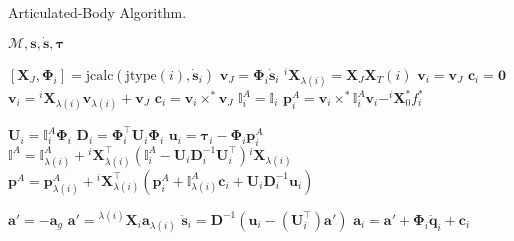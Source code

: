 \begin{algorithm}[h]
    \caption{Articulated-Body Algorithm.}
    \label{alg:aba}
    \begin{algorithmic}[1]
        \Require $\mathcal{M}, \mathbf{s}, \dot{\mathbf{s}}, \boldsymbol{\tau}$

        \State $[\mathbf{X}_J, \boldsymbol{\Phi}_i] = \text{jcalc}(\text{jtype}(i), \dot{\mathbf{s}}_i)$
        \State $\mathrm{\mathbf{v}}_J = \boldsymbol{\Phi}_i \dot{\mathbf{s}}_i$
        \State $^i\mathbf{X}_{\lambda(i)} = \mathbf{X}_J\mathbf{X}_T (i)$
        \State $\mathrm{\mathbf{v}}_i = \mathrm{\mathbf{v}}_J$
        \State $\mathbf{c}_i = \mathbf{0}$
        \Else
        \State $\mathrm{\mathbf{v}}_i = {}^i\mathbf{X} _{\lambda(i)}\mathrm{\mathbf{v}}_{\lambda(i)} + \mathrm{\mathbf{v}}_J$
        \State $\mathbf{c}_i = \mathrm{\mathbf{v}}_i \times ^* \mathrm{\mathbf{v}}_J$
        \EndIf
        \State $\mathbb{I} _i ^A = \mathbb{I} _i$
        \State $\mathbf{p}_i ^A = \mathrm{\mathbf{v}}_i \times^* \mathbb{I} _i ^A \mathrm{\mathbf{v}}_i - ^i\mathbf{X} _0 ^* f ^* _i $
        \EndFor

        \item[]

        \State $\mathbf{U}_i = \mathbb{I} _i ^A \boldsymbol{\Phi}_i$
        \State $\mathbf{D} _i = \boldsymbol{\Phi} ^\top _i  {} \mathbf{U} _i \boldsymbol{\Phi} _i $
        \State $\mathbf{u}_i = \boldsymbol{\tau}_i - \boldsymbol{\Phi}_i\mathbf{p}_i^A$
        \State $\mathbb{I} ^A = \mathbb{I} ^A _{\lambda (i)} + {} ^i \mathbf{X} _{\lambda (i)} ^\top (\mathbb{I} _i ^A - {}  \mathbf{U} _i  \mathbf{D} ^{-1} _i  {}  \mathbf{U} ^\top _i) {} ^i \mathbf{X} _{\lambda (i)} $
        \State $\mathbf{p} ^A = \mathbf{p} ^A _{\lambda (i)} + {} ^i \mathbf{X} _{\lambda (i)} ^\top (\mathbf{p} ^A_i + \mathbb{I} ^A _{\lambda (i)}  \mathbf{c}_i + {}  \mathbf{U} _i \mathbf{D} ^{-1} _i {} \mathbf{u} _i) $
        \EndIf
        \EndFor

        \item[]

        \State $\mathbf{a}' = -\mathbf{a}_g$
        \Else
        \State $\mathbf{a}' = {}^{\lambda(i)}\mathbf{X}_i \mathbf{a}_{\lambda(i)}$
        \State $\ddot{\mathbf{s}}_i = \mathbf{D}^{-1} (\mathbf{u}_i - (\mathbf{U}_i^\top)\mathbf{a}')$
        \State $\mathbf{a}_i = \mathbf{a}' + \boldsymbol{\Phi}_i\mathbf{\ddot{q}}_i + \mathbf{c} _i$
        \EndIf
        \EndFor
    \end{algorithmic}
\end{algorithm}
